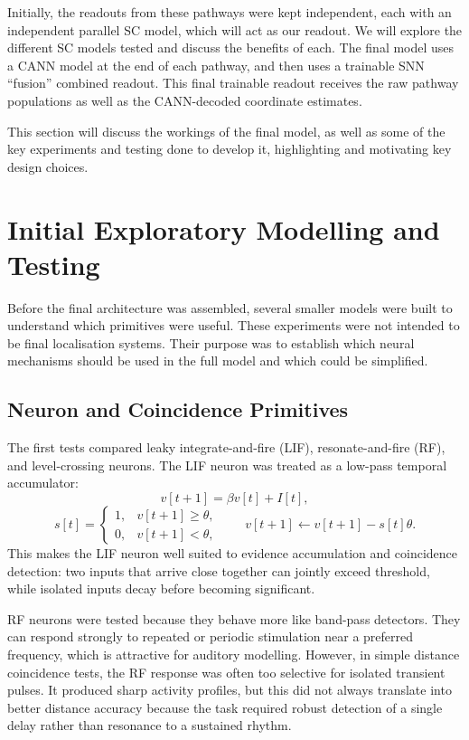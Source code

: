 Initially, the readouts from these pathways were kept independent, each with an independent parallel SC model, which will act as our readout. We will explore the different SC models tested and discuss the benefits of each. The final model uses a CANN model at the end of each pathway, and then uses a trainable SNN ``fusion'' combined readout. This final trainable readout receives the raw pathway populations as well as the CANN-decoded coordinate estimates.

This section will discuss the workings of the final model, as well as some of the key experiments and testing done to develop it, highlighting and motivating key design choices.

\section{Initial Exploratory Modelling and Testing}

Before the final architecture was assembled, several smaller models were built to understand which primitives were useful. These experiments were not intended to be final localisation systems. Their purpose was to establish which neural mechanisms should be used in the full model and which could be simplified.

\subsection{Neuron and Coincidence Primitives}

The first tests compared leaky integrate-and-fire (LIF), resonate-and-fire (RF), and level-crossing neurons. The LIF neuron was treated as a low-pass temporal accumulator:
\begin{equation}
    v[t+1] = \beta v[t] + I[t],
\end{equation}
\begin{equation}
    s[t] =
    \begin{cases}
        1, & v[t+1] \geq \theta,\\
        0, & v[t+1] < \theta,
    \end{cases}
    \qquad
    v[t+1] \leftarrow v[t+1] - s[t]\theta.
\end{equation}
This makes the LIF neuron well suited to evidence accumulation and coincidence detection: two inputs that arrive close together can jointly exceed threshold, while isolated inputs decay before becoming significant.

RF neurons were tested because they behave more like band-pass detectors. They can respond strongly to repeated or periodic stimulation near a preferred frequency, which is attractive for auditory modelling. However, in simple distance coincidence tests, the RF response was often too selective for isolated transient pulses. It produced sharp activity profiles, but this did not always translate into better distance accuracy because the task required robust detection of a single delay rather than resonance to a sustained rhythm.

